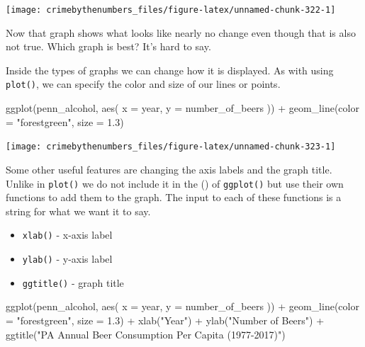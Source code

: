 \documentclass[
]{krantz}
\makeatletter
\newenvironment{Shaded}{\begin{snugshade}}{\end{snugshade}}
\newcommand{\AttributeTok}[1]{\textcolor[rgb]{0.61,0.61,0.61}{#1}}
\newcommand{\FloatTok}[1]{\textcolor[rgb]{0.06,0.06,0.06}{#1}}
\newcommand{\FunctionTok}[1]{\textcolor[rgb]{0,0,0}{#1}}
\newcommand{\NormalTok}[1]{#1}
\newcommand{\SpecialCharTok}[1]{\textcolor[rgb]{0,0,0}{#1}}
\newcommand{\StringTok}[1]{\textcolor[rgb]{0.5,0.5,0.5}{#1}}
\providecommand{\tightlist}{%
  \setlength{\itemsep}{0pt}\setlength{\parskip}{0pt}}
\newenvironment{kframe}{%
\medskip{}
\setlength{\fboxsep}{.8em}
 \def\at@end@of@kframe{}%
 \ifinner\ifhmode%
  \def\at@end@of@kframe{\end{minipage}}%
  \begin{minipage}{\columnwidth}%
 \fi\fi%
 \def\FrameCommand##1{\hskip\@totalleftmargin \hskip-\fboxsep
 \colorbox{shadecolor}{##1}\hskip-\fboxsep
     \hskip-\linewidth \hskip-\@totalleftmargin \hskip\columnwidth}%
 \MakeFramed {\advance\hsize-\width
   \@totalleftmargin\z@ \linewidth\hsize
   \@setminipage}}%
 {\par\unskip\endMakeFramed%
 \at@end@of@kframe}
\renewenvironment{Shaded}{\begin{kframe}}{\end{kframe}}
\makeatother
\begin{document}
\begin{center}\texttt{[image: crimebythenumbers\_files/figure-latex/unnamed-chunk-322-1]} \end{center}

Now that graph shows what looks like nearly no change even
though that is also not true. Which graph is best? It's hard
to say.

Inside the types of graphs we can change how it is
displayed. As with using \texttt{plot()}, we can specify the
color and size of our lines or points.

\begin{Shaded}
\begin{Highlighting}[]
\FunctionTok{ggplot}\NormalTok{(penn\_alcohol, }\FunctionTok{aes}\NormalTok{(}
  \AttributeTok{x =}\NormalTok{ year,}
  \AttributeTok{y =}\NormalTok{ number\_of\_beers}
\NormalTok{)) }\SpecialCharTok{+}
  \FunctionTok{geom\_line}\NormalTok{(}\AttributeTok{color =} \StringTok{"forestgreen"}\NormalTok{, }\AttributeTok{size =} \FloatTok{1.3}\NormalTok{)}
\end{Highlighting}
\end{Shaded}

\begin{center}\texttt{[image: crimebythenumbers\_files/figure-latex/unnamed-chunk-323-1]} \end{center}

Some other useful features are changing the axis labels and
the graph title. Unlike in \texttt{plot()} we do not include
it in the () of \texttt{ggplot()} but use their own
functions to add them to the graph. The input to each of
these functions is a string for what we want it to say.

\begin{itemize}
\tightlist
\item
  \texttt{xlab()} - x-axis label
\item
  \texttt{ylab()} - y-axis label
\item
  \texttt{ggtitle()} - graph title
\end{itemize}

\begin{Shaded}
\begin{Highlighting}[]
\FunctionTok{ggplot}\NormalTok{(penn\_alcohol, }\FunctionTok{aes}\NormalTok{(}
  \AttributeTok{x =}\NormalTok{ year,}
  \AttributeTok{y =}\NormalTok{ number\_of\_beers}
\NormalTok{)) }\SpecialCharTok{+}
  \FunctionTok{geom\_line}\NormalTok{(}\AttributeTok{color =} \StringTok{"forestgreen"}\NormalTok{, }\AttributeTok{size =} \FloatTok{1.3}\NormalTok{) }\SpecialCharTok{+}
  \FunctionTok{xlab}\NormalTok{(}\StringTok{"Year"}\NormalTok{) }\SpecialCharTok{+}
  \FunctionTok{ylab}\NormalTok{(}\StringTok{"Number of Beers"}\NormalTok{) }\SpecialCharTok{+}
  \FunctionTok{ggtitle}\NormalTok{(}\StringTok{"PA Annual Beer Consumption Per Capita (1977{-}2017)"}\NormalTok{)}
\end{Highlighting}
\end{Shaded}
\end{document}
